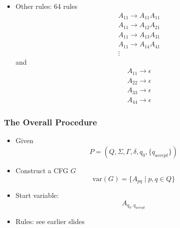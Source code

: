 \begin{frame}[allowframebreaks]
\begin{itemize}
\item Other rules: 64 rules
  \begin{eqnarray*}
&&A_{11}\rightarrow A_{11}A_{11}\\
&&A_{11}\rightarrow A_{12}A_{21}\\
&&A_{11}\rightarrow A_{13}A_{31}\\
&&A_{11}\rightarrow A_{14}A_{41}\\
&&\vdots
\end{eqnarray*}
and
\begin{eqnarray*}
&& A_{11}\rightarrow \epsilon \\  
&& A_{22}\rightarrow \epsilon \\
&& A_{33}\rightarrow \epsilon \\
&& A_{44}\rightarrow \epsilon 
\end{eqnarray*}

\end{itemize}\end{frame}

\begin{frame}[allowframebreaks]
  \frametitle{The Overall Procedure}
  \begin{itemize}
  \item Given
    \begin{equation*}
    P=(Q,\Sigma, \Gamma, \delta, q_0, \{q_{accept}\})
  \end{equation*}
  \item Construct a CFG $G$
    \begin{equation*}
\text{var}(G) =\{A_{pq}\mid p, q \in Q\}
\end{equation*}
\item Start variable:
  \begin{equation*}
  A_{q_0, q_{accept}}
\end{equation*}

\item Rules: see earlier slides
  \end{itemize}
\end{frame}

